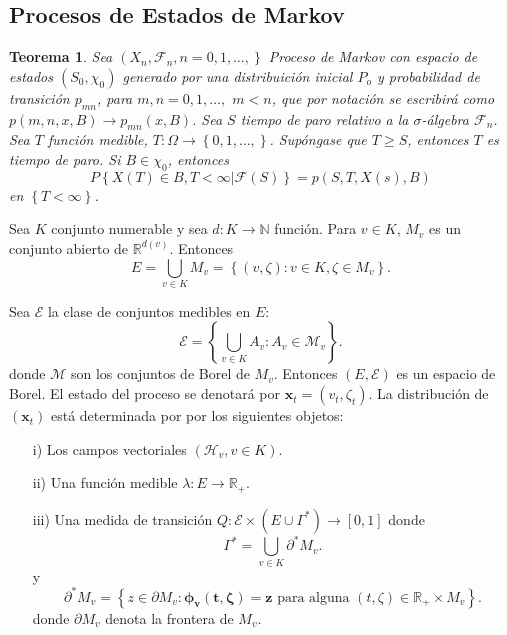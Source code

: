 \documentclass{article}
\newtheorem{Teo}{Teorema}[section]
\newcommand{\nat}{\mathbb{N}}
\newcommand{\rea}{\mathbb{R}}
\numberwithin{equation}{section}
\begin{document}
\subsection*{Procesos de Estados de Markov}

\begin{Teo}
Sea $\left(X_{n},\mathcal{F}_{n},n=0,1,\ldots,\right\}$ Proceso de Markov con espacio de estados $\left(S_{0},\chi_{0}\right)$ generado por una distribuici\'on inicial $P_{o}$ y probabilidad de transici\'on $p_{mn}$, para $m,n=0,1,\ldots,$ $m<n$, que por notaci\'on se escribir\'a como $p\left(m,n,x,B\right)\rightarrow p_{mn}\left(x,B\right)$. Sea $S$ tiempo de paro relativo a la $\sigma$-\'algebra $\mathcal{F}_{n}$. Sea $T$ funci\'on medible, $T:\Omega\rightarrow\left\{0,1,\ldots,\right\}$. Sup\'ongase que $T\geq S$, entonces $T$ es tiempo de paro. Si $B\in\chi_{0}$, entonces
\begin{equation}\label{Prop.Fuerte.Markov}
P\left\{X\left(T\right)\in B,T<\infty|\mathcal{F}\left(S\right)\right\} =
p\left(S,T,X\left(s\right),B\right)
\end{equation}
en $\left\{T<\infty\right\}$.
\end{Teo}


Sea $K$ conjunto numerable y sea $d:K\rightarrow\nat$ funci\'on. Para $v\in K$, $M_{v}$ es un conjunto abierto de $\rea^{d\left(v\right)}$. Entonces \[E=\bigcup_{v\in K}M_{v}=\left\{\left(v,\zeta\right):v\in K,\zeta\in M_{v}\right\}.\]

Sea $\mathcal{E}$ la clase de conjuntos medibles en $E$:
\[\mathcal{E}=\left\{\bigcup_{v\in K}A_{v}:A_{v}\in \mathcal{M}_{v}\right\}.\] donde $\mathcal{M}$ son los conjuntos de Borel de $M_{v}$. Entonces $\left(E,\mathcal{E}\right)$ es un espacio de Borel. El estado del proceso se denotar\'a por $\mathbf{x}_{t}=\left(v_{t},\zeta_{t}\right)$. La distribuci\'on de $\left(\mathbf{x}_{t}\right)$ est\'a determinada por por los siguientes objetos:

\begin{itemize}
\item[i)] Los campos vectoriales $\left(\mathcal{H}_{v},v\in K\right)$. \item[ii)] Una funci\'on medible $\lambda:E\rightarrow \rea_{+}$. \item[iii)] Una medida de transici\'on $Q:\mathcal{E}\times\left(E\cup\Gamma^{*}\right)\rightarrow\left[0,1\right]$ donde
\begin{equation}
\Gamma^{*}=\bigcup_{v\in K}\partial^{*}M_{v}.
\end{equation}
y
\begin{equation}
\partial^{*}M_{v}=\left\{z\in\partial M_{v}:\mathbf{\mathbf{\phi}_{v}\left(t,\zeta\right)=\mathbf{z}}\textrm{ para alguna }\left(t,\zeta\right)\in\rea_{+}\times M_{v}\right\}.
\end{equation}
donde $\partial M_{v}$ denota  la frontera de $M_{v}$.
\end{itemize}
\end{document}
